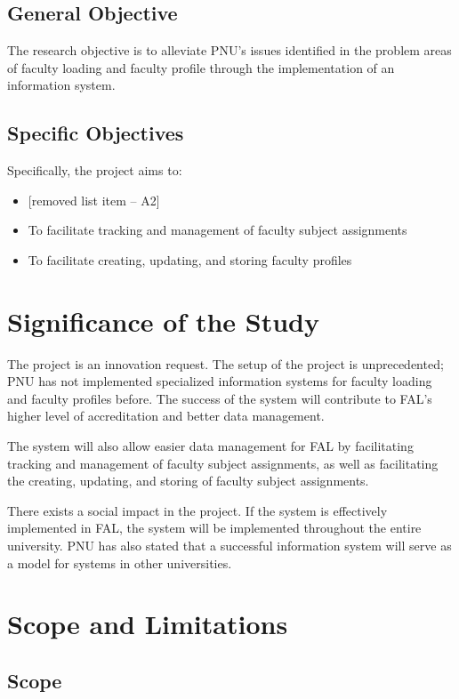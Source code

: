 \subsection{General Objective}
The research objective is to alleviate PNU's issues identified in the problem areas of faculty loading and faculty profile through the implementation of an information system.

\subsection{Specific Objectives}
Specifically, the project aims to:
\begin{itemize}
\item{[removed list item -- A2]}
\item{To facilitate tracking and management of faculty subject assignments}
\item{To facilitate creating, updating, and storing faculty profiles}
\end{itemize}

\section{Significance of the Study}
The project is an innovation request. The setup of the project is unprecedented; PNU has not implemented specialized information systems for faculty loading and faculty profiles before. The success of the system will contribute to FAL’s higher level of accreditation and better data management.

The system will also allow easier data management for FAL by facilitating tracking and management of faculty subject assignments, as well as facilitating the creating, updating, and storing of faculty subject assignments. 

There exists a social impact in the project. If the system is effectively implemented in FAL, the system will be implemented throughout the entire university. PNU has also stated that a successful information system will serve as a model for systems in other universities.

\section{Scope and Limitations}

\subsection{Scope}

